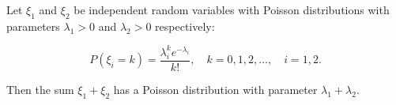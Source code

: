 Let $\xi_1$ and $\xi_2$ be independent random variables with Poisson distributions with parameters $\lambda_1 > 0$ and $\lambda_2 > 0$ respectively:

$$P(\xi_i = k) = \frac{\lambda_i^k e^{-\lambda_i}}{k!}, \quad k = 0, 1, 2, \ldots, \quad i = 1, 2.$$

Then the sum $\xi_1 + \xi_2$ has a Poisson distribution with parameter $\lambda_1 + \lambda_2$.
